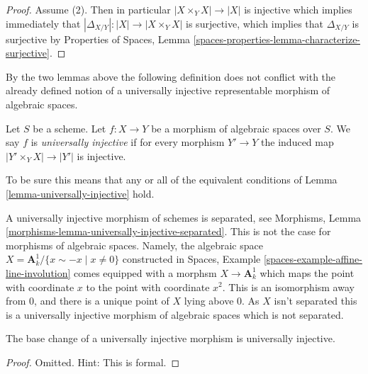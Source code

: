 \begin{proof}
\medskip\noindent
Assume (2). Then in particular $|X \times_Y X| \to |X|$ is injective
which implies immediately that
$|\Delta_{X/Y}| : |X| \to |X \times_Y X|$ is surjective, which
implies that $\Delta_{X/Y}$ is surjective by
Properties of Spaces,
Lemma \ref{spaces-properties-lemma-characterize-surjective}.
\end{proof}

\noindent
By the two lemmas above the following definition does not conflict with
the already defined notion of a universally injective representable morphism
of algebraic spaces.

\begin{definition}
\label{definition-universally-injective}
Let $S$ be a scheme. Let $f : X \to Y$ be a morphism of algebraic
spaces over $S$. We say $f$ is {\it universally injective} if
for every morphism $Y' \to Y$ the induced map
$|Y' \times_Y X| \to |Y'|$ is injective.
\end{definition}

\noindent
To be sure this means that any or all of the equivalent conditions of
Lemma \ref{lemma-universally-injective}
hold.

\begin{remark}
\label{remark-universally-injective-not-serparated}
A universally injective morphism of schemes is separated, see
Morphisms, Lemma
\ref{morphisms-lemma-universally-injective-separated}.
This is not the case for morphisms of algebraic spaces.
Namely, the algebraic space
$X = \mathbf{A}^1_k/\{x \sim -x \mid x \not = 0\}$
constructed in
Spaces, Example \ref{spaces-example-affine-line-involution}
comes equipped with a morphsm $X \to \mathbf{A}^1_k$ which maps
the point with coordinate $x$ to the point with coordinate $x^2$.
This is an isomorphism away from $0$, and there is a unique point
of $X$ lying above $0$. As $X$ isn't separated this is a universally
injective morphism of algebraic spaces which is not separated.
\end{remark}

\begin{lemma}
\label{lemma-base-change-universally-injective}
The base change of a universally injective morphism is universally injective.
\end{lemma}

\begin{proof}
Omitted. Hint: This is formal.
\end{proof}

